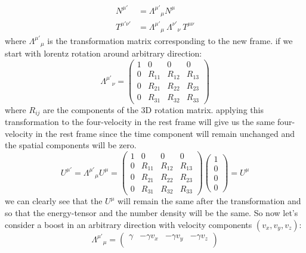 \documentclass[11pt, a4paper]{report}
\begin{document}
\begin{itemize}
    \begin{align*}     
        N^{\mu'} &= {\Lambda^{\mu'}}_\mu N^\mu \\
        T^{\mu'\nu'} &= {\Lambda^{\mu'}}_\mu \ {\Lambda^{\nu'}}_\nu \ T^{\mu\nu}
    \end{align*}
    where ${\Lambda^{\mu'}}_\mu$ is the transformation matrix corresponding to the new frame. if we start with lorentz rotation around arbitrary direction:
    \begin{equation}
        {\Lambda^{\mu'}}_\nu =
        \begin{pmatrix}
        1 & 0 & 0 & 0 \\
        0 & R_{11} & R_{12} & R_{13} \\
        0 & R_{21} & R_{22} & R_{23} \\
        0 & R_{31} & R_{32} & R_{33}
        \end{pmatrix}
    \end{equation}
    where $R_{ij}$ are the components of the 3D rotation matrix. applying this transformation to the four-velocity in the rest frame will give us the same four-velocity in the rest frame since the time component will remain unchanged and the spatial components will be zero.
    \begin{equation}
        U^{\mu'} = {\Lambda^{\mu'}}_\mu U^\mu = 
        \begin{pmatrix}
        1 & 0 & 0 & 0 \\
        0 & R_{11} & R_{12} & R_{13} \\
        0 & R_{21} & R_{22} & R_{23} \\
        0 & R_{31} & R_{32} & R_{33}
        \end{pmatrix}
        \begin{pmatrix}
            1 \\
            0\\
            0 \\
            0
        \end{pmatrix} = U^\mu
    \end{equation}
    we can clearly see that the $U^\mu$ will remain the same after the transformation and so that the energy-tensor and the number density will be the same. So now let's consider a boost in an arbitrary direction with velocity components $(v_x, v_y, v_z)$:
    \begin{equation}
    {\Lambda^{\mu'}}_\mu =
        \begin{pmatrix}
        \gamma & -\gamma v_x & -\gamma v_y & -\gamma v_z \\

\end{pmatrix}
\end{equation}
\end{itemize}
\end{document}
